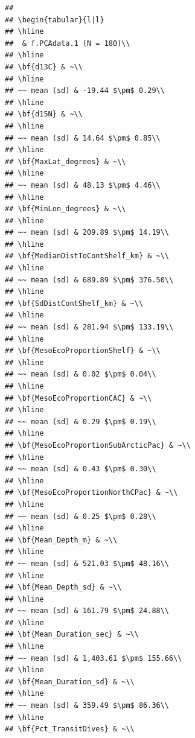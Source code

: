 \documentclass[
]{article}
\begin{document}
\begin{verbatim}
## 
## \begin{tabular}{l|l}
## \hline
##  & f.PCAdata.1 (N = 180)\\
## \hline
## \bf{d13C} & ~\\
## \hline
## ~~ mean (sd) & -19.44 $\pm$ 0.29\\
## \hline
## \bf{d15N} & ~\\
## \hline
## ~~ mean (sd) & 14.64 $\pm$ 0.85\\
## \hline
## \bf{MaxLat_degrees} & ~\\
## \hline
## ~~ mean (sd) & 48.13 $\pm$ 4.46\\
## \hline
## \bf{MinLon_degrees} & ~\\
## \hline
## ~~ mean (sd) & 209.89 $\pm$ 14.19\\
## \hline
## \bf{MedianDistToContShelf_km} & ~\\
## \hline
## ~~ mean (sd) & 689.89 $\pm$ 376.50\\
## \hline
## \bf{SdDistContShelf_km} & ~\\
## \hline
## ~~ mean (sd) & 281.94 $\pm$ 133.19\\
## \hline
## \bf{MesoEcoProportionShelf} & ~\\
## \hline
## ~~ mean (sd) & 0.02 $\pm$ 0.04\\
## \hline
## \bf{MesoEcoProportionCAC} & ~\\
## \hline
## ~~ mean (sd) & 0.29 $\pm$ 0.19\\
## \hline
## \bf{MesoEcoProportionSubArcticPac} & ~\\
## \hline
## ~~ mean (sd) & 0.43 $\pm$ 0.30\\
## \hline
## \bf{MesoEcoProportionNorthCPac} & ~\\
## \hline
## ~~ mean (sd) & 0.25 $\pm$ 0.28\\
## \hline
## \bf{Mean_Depth_m} & ~\\
## \hline
## ~~ mean (sd) & 521.03 $\pm$ 48.16\\
## \hline
## \bf{Mean_Depth_sd} & ~\\
## \hline
## ~~ mean (sd) & 161.79 $\pm$ 24.88\\
## \hline
## \bf{Mean_Duration_sec} & ~\\
## \hline
## ~~ mean (sd) & 1,403.61 $\pm$ 155.66\\
## \hline
## \bf{Mean_Duration_sd} & ~\\
## \hline
## ~~ mean (sd) & 359.49 $\pm$ 86.36\\
## \hline
## \bf{Pct_TransitDives} & ~\\

\end{verbatim}
\end{document}
